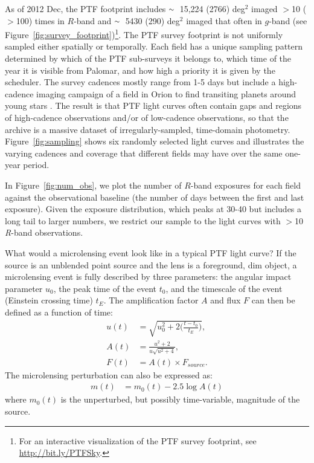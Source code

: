 \documentclass{emulateapj}
\newcommand{\apwsim}{\raisebox{0.2ex}{\scriptsize$\sim$\normalsize}}
\begin{document}
As of 2012 Dec, the PTF footprint includes $\apwsim$15,224 (2766) deg$^2$ imaged $>$10 ($>$100) times in $R$-band and $\apwsim$5430 (290) deg$^2$ imaged that often in $g$-band (see Figure~\ref{fig:survey_footprint})\footnote{For an interactive visualization of the PTF survey footprint, see \url{http://bit.ly/PTFSky}.}. The PTF survey footprint is not uniformly sampled either spatially or temporally. Each field has a unique sampling pattern determined by which of the PTF sub-surveys it belongs to, which time of the year it is visible from Palomar, and how high a priority it is given by the scheduler. The survey cadences mostly range from 1-5 days but include a high-cadence imaging campaign of a field in Orion to find transiting planets around young stars \citep{nick2009}. The result is that PTF light curves often contain gaps and regions of high-cadence observations and/or of low-cadence observations, so that the archive is a massive dataset of irregularly-sampled, time-domain photometry. Figure~\ref{fig:sampling} shows six randomly selected light curves and illustrates the varying cadences and coverage that different fields may have over the same one-year period. 

In Figure~\ref{fig:num_obs}, we plot the number of $R$-band exposures for each field against the observational baseline (the number of days between the first and last exposure). Given the exposure distribution, which peaks at 30-40 but includes a long tail to larger numbers, we restrict our sample to the light curves with $>$10 \textit{R}-band observations. %

What would a microlensing event look like in a typical PTF light curve? If the source is an unblended point source and the lens is a foreground, dim object, a microlensing event is fully described by three parameters: the angular impact parameter $u_0$, the peak time of the event $t_0$, and the timescale of the event (Einstein crossing time) $t_E$. The amplification factor $A$ and flux $F$ can then be defined as a function of time: 
\begin{align}
	u(t) &= \sqrt{u_0^2 + 2\Big(\frac{t-t_0}{t_E}\Big)},\\
	A(t) &= \frac{u^2 + 2}{u\sqrt{u^2 + 4}},\\
	F(t) &= A(t)\times F_{source}.
\end{align}
The microlensing perturbation can also be expressed as:
\begin{align}\label{eq:ml_model}
	m(t) &= m_0(t) - 2.5\log A(t)
\end{align}
where $m_0(t)$ is the unperturbed, but possibly time-variable, magnitude of the source.
\end{document}
